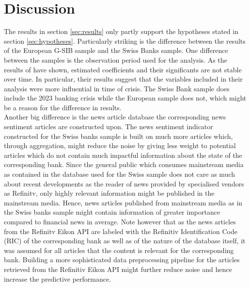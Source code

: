 


%
%
%


\section{Discussion}

The results in section \ref{sec:results} only partly support the hypotheses stated in section \ref{sec:hypotheses}. Particularly striking is the difference between the results of the European G-SIB sample and the Swiss Banks sample. One difference between the samples is the observation period used for the analysis. As the results of \cite{annaert2013} have shown, estimated coefficients and their significants are not stable over time. In particular, their results suggest that the variables included in their analysis were more influential in time of crisis. The Swiss Bank sample does include the 2023 banking crisis while the European sample does not, which might be a reason for the difference in results. \\

Another big difference is the news article database the corresponding news sentiment articles are constructed upon. The news sentiment indicator constructed for the Swiss banks sample is built on much more articles which, through aggregation, might reduce the noise by giving less weight to potential articles which do not contain much impactful information about the state of the corresponding bank. Since the general public which consumes mainstream media as contained in the database used for the Swiss sample does not care as much about recent developments as the reader of news provided by specialised vendors as Refinitv, only highly relevant information might be published in the mainstream media. Hence, news articles published from mainstream media as in the Swiss banks sample might contain information of greater importance compared to financial news in average. Note however that as the news articles from the Refinitv Eikon API are labeled with the Refinitiv Identification Code (RIC) of the corresponding bank as well as of the nature of the database itself, it was assumed for all articles that the content is relevant for the corresponding bank. Building a more sophisticated data preprocessing pipeline for the articles retrieved from the Refinitiv Eikon API might further reduce noise and hence increase the predictive performance. \\

